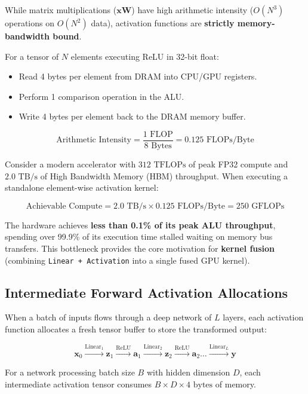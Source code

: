 \documentclass[
  letterpaper,
]{scrbook}
\providecommand{\tightlist}{%
  \setlength{\itemsep}{0pt}\setlength{\parskip}{0pt}}
\begin{document}
While matrix multiplications (\(\mathbf{x} \mathbf{W}\)) have high
arithmetic intensity (\(O(N^3)\) operations on \(O(N^2)\) data),
activation functions are \textbf{strictly memory-bandwidth bound}.

For a tensor of \(N\) elements executing ReLU in 32-bit float:

\begin{itemize}
\tightlist
\item
  Read 4 bytes per element from DRAM into CPU/GPU registers.
\item
  Perform 1 comparison operation in the ALU.
\item
  Write 4 bytes per element back to the DRAM memory buffer.
\end{itemize}

\[\text{Arithmetic Intensity} = \frac{1\text{ FLOP}}{8\text{ Bytes}} = 0.125\text{ FLOPs/Byte}\]

Consider a modern accelerator with \(312\text{ TFLOPs}\) of peak FP32
compute and \(2.0\text{ TB/s}\) of High Bandwidth Memory (HBM)
throughput. When executing a standalone element-wise activation kernel:

\[\text{Achievable Compute} = 2.0\text{ TB/s} \times 0.125\text{ FLOPs/Byte} = 250\text{ GFLOPs}\]

The hardware achieves \textbf{less than 0.1\% of its peak ALU
throughput}, spending over 99.9\% of its execution time stalled waiting
on memory bus transfers. This bottleneck provides the core motivation
for \textbf{kernel fusion} (combining \texttt{Linear\ +\ Activation}
into a single fused GPU kernel).

\subsection{Intermediate Forward Activation
Allocations}\label{intermediate-forward-activation-allocations}

When a batch of inputs flows through a deep network of \(L\) layers,
each activation function allocates a fresh tensor buffer to store the
transformed output:

\[\mathbf{x}_0 \xrightarrow{\text{Linear}_1} \mathbf{z}_1 \xrightarrow{\text{ReLU}} \mathbf{a}_1 \xrightarrow{\text{Linear}_2} \mathbf{z}_2 \xrightarrow{\text{ReLU}} \mathbf{a}_2 \dots \xrightarrow{\text{Linear}_L} \mathbf{y}\]

For a network processing batch size \(B\) with hidden dimension \(D\),
each intermediate activation tensor consumes
\(B \times D \times 4\text{ bytes}\) of memory.
\end{document}

